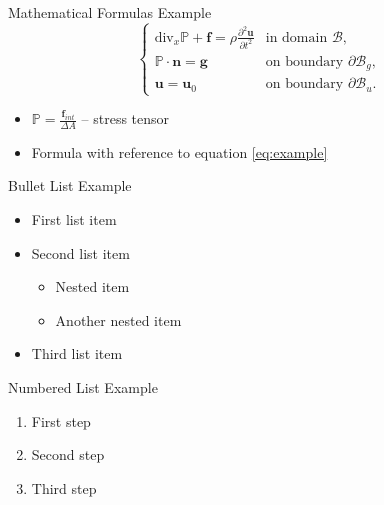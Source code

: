 \documentclass[10pt]{beamer}  %
\newcommand{\bP}{\mathbb{P}}
\begin{document}
\begin{frame}{Mathematical Formulas Example}
    \begin{equation}
        \label{eq:example}
        \begin{cases}
             \text{div}_x \bP + \boldsymbol{f} = \rho \frac{\partial^2 \boldsymbol{u}}{\partial t^2}  & \text{in domain } \mathcal{B}, \\
            \bP \cdot \boldsymbol{n} = \boldsymbol{g} & \text{on boundary } \partial \mathcal{B}_g, \\
            \boldsymbol{u} = \boldsymbol{u}_0 & \text{on boundary } \partial \mathcal{B}_u.
        \end{cases}
    \end{equation}
    
    \begin{itemize}
        \item $\displaystyle \bP = \frac{\boldsymbol{f}_{int}}{\Delta A}$ -- stress tensor
        \item Formula with reference to equation \eqref{eq:example}
    \end{itemize}
\end{frame}

\begin{frame}{Bullet List Example}
    \begin{itemize}
        \item First list item
        \item Second list item
            \begin{itemize}
                \item Nested item
                \item Another nested item
            \end{itemize}
        \item Third list item
    \end{itemize}
\end{frame}

\begin{frame}{Numbered List Example}
    \begin{enumerate}
        \item First step
        \item Second step
        \item Third step
    \end{enumerate}
\end{frame}
\end{document}
